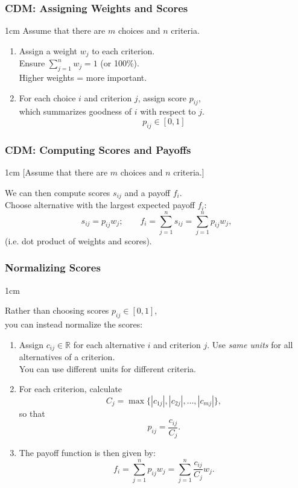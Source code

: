 \begin{frame}
\frametitle{CDM: Assigning Weights and Scores}

\begin{changemargin}{1cm}
Assume that there are $m$ choices and $n$ criteria. 
\begin{enumerate}
\item Assign a weight
  $w_j$ to each criterion. \\
  Ensure $\sum_{j=1}^n w_j = 1$ (or
  100\%). \\ Higher weights = more important.
\item For each choice $i$ and criterion $j$, assign score $p_{ij}$,\\
  which summarizes goodness of $i$ with respect to $j$.\\

  \[ p_{ij} \in [0, 1] \]
\end{enumerate}
\end{changemargin}
\end{frame}

\begin{frame}
\frametitle{CDM: Computing Scores and Payoffs}

\begin{changemargin}{1cm}
[Assume that there are $m$ choices and $n$ criteria.]

We can then compute scores $s_{ij}$ and a payoff $f_i$.\\

Choose alternative with
the largest expected payoff $f_i$:
\[ s_{ij} = p_{ij} w_j; \qquad f_i = \sum_{j=1}^n s_{ij} = \sum_{j=1}^n p_{ij} w_j, \]
(i.e. dot product of weights and scores).

\end{changemargin}

\end{frame}

\begin{frame}

\frametitle{Normalizing Scores}

\begin{changemargin}{1cm}

 Rather than choosing scores
$p_{ij} \in [0, 1]$, \\
you can instead normalize the scores:
\begin{enumerate}
\item Assign $c_{ij} \in \mathbb{R}$ for each alternative $i$ and criterion $j$.
Use \emph{same units} for all alternatives of a 
 criterion. \\ You can use different units for different criteria.
\item For each criterion, calculate
\[ C_j = \max \{ |c_{1j}|, |c_{2j}|, \ldots, |c_{mj}| \}, \]
so that
\[ p_{ij} = \frac{c_{ij}}{C_j}. \]
\item The payoff function is then given by:
\[ f_i = \sum_{j=1}^n p_{ij} w_j = \sum_{j=1}^n \frac{c_{ij}}{C_j}  w_j. \]
\end{enumerate}

\end{changemargin}

\end{frame}


